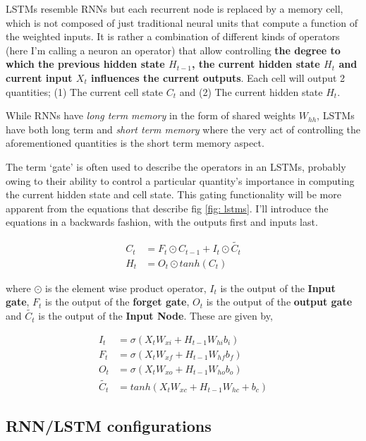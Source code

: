 \documentclass[12pt, letterpaper]{article}
\begin{document}
LSTMs resemble RNNs but each recurrent node is replaced by a memory cell, which is not composed
of just traditional neural units that compute a function of the weighted inputs. It is rather
a combination of different kinds of operators (here I'm calling a neuron an operator) that
allow controlling \textbf{the degree to which the previous hidden state $H_{t-1}$, the current 
hidden state $H_t$ and current input $X_t$ influences the current outputs}. Each cell will 
output 2 quantities; (1) The current cell state $C_t$ and (2) The current hidden state $H_t$.

While RNNs have \textit{long term memory} in the form of shared weights $W_{hh}$, LSTMs
have both long term and \textit{short term memory} where the very act of controlling the 
aforementioned quantities is the short term memory aspect.\cite{zhang2023dive}

The term `gate' is often used to describe the operators in an LSTMs, probably owing 
to their ability to control a particular quantity's importance in computing the 
current hidden state and cell state. This gating functionality will be more apparent
from the equations that describe fig \ref{fig: lstms}. I'll introduce the equations 
in a backwards fashion, with the outputs first and inputs last.

\begin{align}
    C_t &= F_t \odot C_{t-1} + I_t \odot \tilde{C_t}\\
    H_t &= O_t \odot tanh(C_t)
\end{align}

where $\odot$ is the element wise product operator, $I_t$ is the output of the \textbf{Input gate}, 
$F_t$ is the output of the \textbf{forget gate}, $O_t$ is the output of the \textbf{output gate} and 
$\tilde{C_t}$ is the output of the \textbf{Input Node}. These are given by,

\begin{align}
    I_t &= \sigma(X_t W_{xi} + H_{t-1} W_{hi} b_i)\\
    F_t &= \sigma(X_t W_{xf} + H_{t-1} W_{hf} b_f)\\
    O_t &= \sigma(X_t W_{xo} + H_{t-1} W_{ho} b_o)\\
    \tilde{C_t} &= tanh(X_t W_{xc} + H_{t-1} W_{hc} + b_c)
\end{align}



\subsection{RNN/LSTM configurations}
\end{document}
